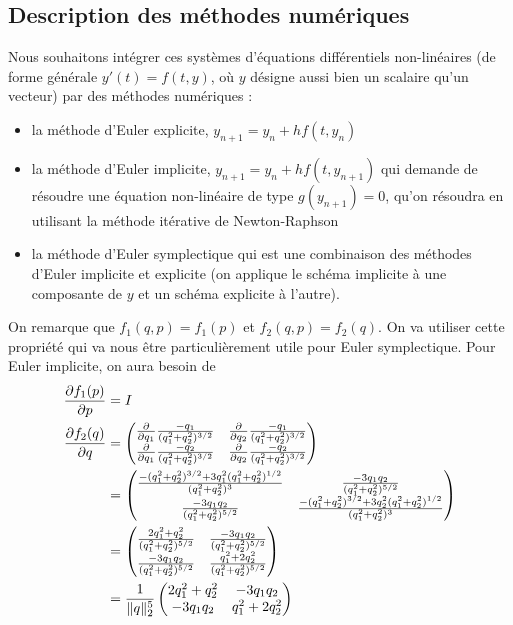 \subsection{Description des méthodes numériques}
Nous souhaitons intégrer ces systèmes d'équations différentiels non-linéaires (de forme générale $y'(t) = f(t,y)$, où $y$ désigne aussi bien un scalaire qu'un vecteur) par des méthodes numériques : 
\begin{itemize}
\item la méthode d'Euler explicite, $y_{n+1} = y_n + h f(t,y_n)$
\item la méthode d'Euler implicite, $y_{n+1} = y_n + h f(t,y_{n+1})$ qui demande de résoudre une équation non-linéaire de type $g(y_{n+1})=0$, qu'on résoudra en utilisant la méthode itérative de Newton-Raphson
\item la méthode d'Euler symplectique qui est une combinaison des méthodes d'Euler implicite et explicite (on applique le schéma implicite à une composante de $y$ et un schéma explicite à l'autre). 
\end{itemize}

On remarque que $f_1(q,p) = f_1(p)$ et $f_2(q,p) = f_2(q)$.
On va utiliser cette propriété qui va nous être particulièrement utile pour Euler symplectique.
Pour Euler implicite, on aura besoin de
\begin{align*}
  \frac{\partial f_1(p)}{\partial p} & = I\\
  \frac{\partial f_2(q)}{\partial q} & =
  \begin{pmatrix}
    \frac{\partial }{\partial q_1}\frac{-q_1}{(q_1^2 + q_2^2)^{3/2}} &
    \frac{\partial }{\partial q_2}\frac{-q_1}{(q_1^2 + q_2^2)^{3/2}}\\
    \frac{\partial }{\partial q_1}\frac{-q_2}{(q_1^2 + q_2^2)^{3/2}} &
    \frac{\partial }{\partial q_2}\frac{-q_2}{(q_1^2 + q_2^2)^{3/2}}
  \end{pmatrix}\\
  & =
  \begin{pmatrix}
    \frac{-(q_1^2 + q_2^2)^{3/2} + 3q_1^2(q_1^2 + q_2^2)^{1/2}}{(q_1^2 + q_2^2)^3} &
    \frac{-3q_1q_2}{(q_1^2 + q_2^2)^{5/2}}\\
    \frac{-3q_1q_2}{(q_1^2 + q_2^2)^{5/2}} &
    \frac{-(q_1^2 + q_2^2)^{3/2} + 3q_2^2(q_1^2 + q_2^2)^{1/2}}{(q_1^2 + q_2^2)^3}
  \end{pmatrix}\\
  & =
  \begin{pmatrix}
    \frac{2q_1^2 + q_2^2}{(q_1^2 + q_2^2)^{5/2}} &
    \frac{-3q_1q_2}{(q_1^2 + q_2^2)^{5/2}}\\
    \frac{-3q_1q_2}{(q_1^2 + q_2^2)^{5/2}} &
    \frac{q_1^2 + 2q_2^2}{(q_1^2 + q_2^2)^{5/2}}
  \end{pmatrix}\\
  & =
  \frac{1}{\|q\|_2^{5}}
  \begin{pmatrix}
    2q_1^2 + q_2^2 &
    -3q_1q_2\\
    -3q_1q_2 &
    q_1^2 + 2q_2^2
  \end{pmatrix}
\end{align*}


